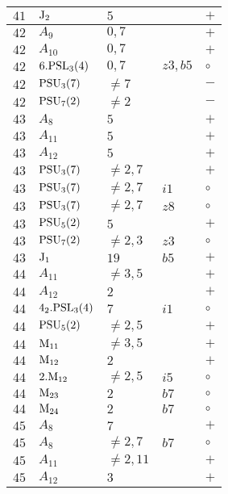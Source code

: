 \documentclass[a4paper, 11pt]{article}
\begin{document}
\begin{longtable}{lllll}
		$41$ & ${\rm J}_2$ & $5$ & & $+$ \\ \hline
		$42$ & $A_{9}$ & $0,7$ & & $+$ \\ \hline
		$42$ & $A_{10}$ & $0,7$ & & $+$ \\ \hline
		$42$ & $6.{\rm PSL}_{3}(4)$ & $0,7$ & $z3, b5$ & $\circ$ \\ \hline
		$42$ & ${\rm PSU}_{3}(7)$ & $\neq 7$ & & $-$ \\ \hline
		$42$ & ${\rm PSU}_{7}(2)$ & $\neq 2$ & & $-$ \\ \hline
		$43$ & $A_{8}$ & $5$ & & $+$ \\ \hline
		$43$ & $A_{11}$ & $5$ & & $+$ \\ \hline
		$43$ & $A_{12}$ & $5$ & & $+$ \\ \hline
		$43$ & ${\rm PSU}_{3}(7)$ & $\neq 2,7$ & & $+$ \\ \hline
		$43$ & ${\rm PSU}_{3}(7)$ & $\neq 2,7$ & $i1$ & $\circ$ \\ \hline
		$43$ & ${\rm PSU}_{3}(7)$ & $\neq 2,7$ & $z8$ & $\circ$ \\ \hline
		$43$ & ${\rm PSU}_{5}(2)$ & $5$ & & $+$ \\ \hline
		$43$ & ${\rm PSU}_{7}(2)$ & $\neq 2,3$ & $z3$ & $\circ$ \\ \hline
		$43$ & ${\rm J}_1$ & $19$ & $b5$ & $+$ \\ \hline
		$44$ & $A_{11}$ & $\neq 3,5$ & & $+$ \\ \hline
		$44$ & $A_{12}$ & $2$ & & $+$ \\ \hline
		$44$ & $4_2.{\rm PSL}_{3}(4)$ & $7$ & $i1$ & $\circ$ \\ \hline
		$44$ & ${\rm PSU}_{5}(2)$ & $\neq 2,5$ & & $+$ \\ \hline
		$44$ & ${\rm M}_{11}$ & $\neq 3,5$ & & $+$ \\ \hline
		$44$ & ${\rm M}_{12}$ & $2$ & & $+$ \\ \hline
		$44$ & $2.{\rm M}_{12}$ & $\neq 2,5$ & $i5$ & $\circ$ \\ \hline
		$44$ & ${\rm M}_{23}$ & $2$ & $b7$ & $\circ$ \\ \hline
		$44$ & ${\rm M}_{24}$ & $2$ & $b7$ & $\circ$ \\ \hline
		$45$ & $A_{8}$ & $7$ & & $+$ \\ \hline
		$45$ & $A_{8}$ & $\neq 2,7$ & $b7$ & $\circ$ \\ \hline
		$45$ & $A_{11}$ & $\neq 2,11$ & & $+$ \\ \hline
		$45$ & $A_{12}$ & $3$ & & $+$ \\ \hline

\end{longtable}
\end{document}

